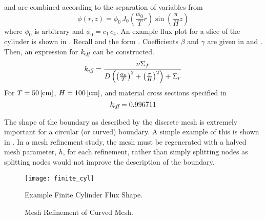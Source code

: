    and  are combined according to
  the separation of variables from 
  \begin{equation}
    \label{eq:analytic_finite_cyl}
    \phi(r,z) = \phi_0 \, 
      J_0\left(\frac{\alpha_0}{T} r\right) \sin\left(\frac{\pi}{H} z \right)
  \end{equation}
  where $\phi_0$ is arbitrary and $\phi_0 = c_1 \, c_4$.
  An example flux plot for a slice of the cylinder is shown in 
  . Recall  and the form 
  . Coefficients $\beta$ and $\gamma$ are given in 
   and . Then, an expression
  for $k_{\!\mbox{\scriptsize \em eff}}$ can be constructed.
  \begin{equation}
    \label{eq:keff_finite_cyl}
    k_{\!\mbox{\scriptsize \em eff}} = \frac{\nu \Sigma_f}{D \left( \left(\frac{\alpha_0}{T}\right)^2 +
    \left( \frac{\pi}{H}\right)^2 \right) + \Sigma_r}
  \end{equation}
  For $T = 50 \left[\text{{cm}}\right]$, $H = 100 \left[\text{{cm}}\right]$, and material cross sections
  specified in 
  \begin{equation}
    k_{\!\mbox{\scriptsize \em eff}} = 0.996711
  \end{equation}
  
  The shape of the boundary as described by the discrete mesh is extremely 
  important for a circular (or curved) boundary. A simple example of this is 
  shown in . In a mesh refinement study, the mesh must 
  be regenerated with a halved mesh parameter, $h$, for each refinement, rather 
  than simply splitting nodes as splitting nodes would not improve the 
  description of the boundary.

  \begin{figure}
    \centering
    \texttt{[image: finite\_cyl]}
    \caption{Example Finite Cylinder Flux Shape.}
    \label{fig:finite_cyl}
  \end{figure}

  \begin{figure}
    \centering
    \hspace{0.25in}
    \caption{Mesh Refinement of Curved Mesh.}
    \label{fig:circle_meshes}
  \end{figure}

